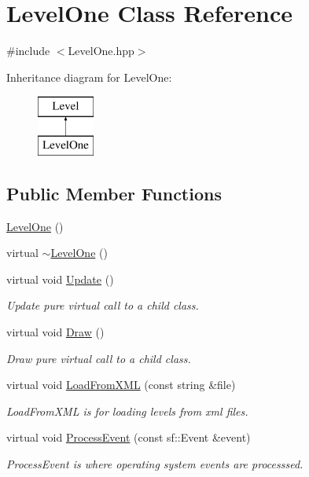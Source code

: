 \hypertarget{class_level_one}{\section{Level\-One Class Reference}
\label{class_level_one}
}


{\ttfamily \#include $<$Level\-One.\-hpp$>$}

Inheritance diagram for Level\-One\-:\begin{figure}[H]
\begin{center}
\leavevmode
\includegraphics[height=2.000000cm]{class_level_one}
\end{center}
\end{figure}
\subsection*{Public Member Functions}
\begin{DoxyCompactItemize}
\item 
\hyperlink{class_level_one_a3fe4df62466654e6e7617377c8bd67a7}{Level\-One} ()
\item 
virtual \hyperlink{class_level_one_a43952923e3867bbdf882d18ac809ae34}{$\sim$\-Level\-One} ()
\item 
virtual void \hyperlink{class_level_one_ad0078eaa35f035c1a6ec7bf0bbef2fba}{Update} ()
\begin{DoxyCompactList}\small\item\em Update pure virtual call to a child class. \end{DoxyCompactList}\item 
virtual void \hyperlink{class_level_one_ac39dc2f3934694f3428737b97001ff41}{Draw} ()
\begin{DoxyCompactList}\small\item\em Draw pure virtual call to a child class. \end{DoxyCompactList}\item 
virtual void \hyperlink{class_level_one_a6ff4ce4a9eaeb94987f897e47de62856}{Load\-From\-X\-M\-L} (const string \&file)
\begin{DoxyCompactList}\small\item\em Load\-From\-X\-M\-L is for loading levels from xml files. \end{DoxyCompactList}\item 
virtual void \hyperlink{class_level_one_ab806ffec162c436857edd2539e8f3d4e}{Process\-Event} (const sf\-::\-Event \&event)
\begin{DoxyCompactList}\small\item\em Process\-Event is where operating system events are processsed. \end{DoxyCompactList}\end{DoxyCompactItemize}
